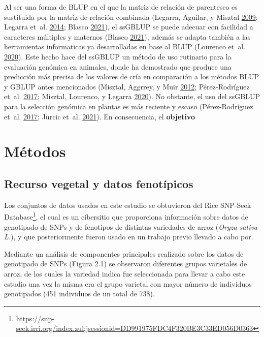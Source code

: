 \documentclass[11pt,spanish,a4paper,oneside,]{book} %
\renewcommand{\href}[2]{#2\footnote{\url{#1}}}
\let\rmarkdownfootnote\footnote%
\def\footnote{\protect\rmarkdownfootnote}
\begin{document}
Al ser una forma de BLUP en el que la matriz de relación de parentesco es sustituida por la matriz de relación combinada (Legarra, Aguilar, y Misztal \protect\hyperlink{ref-cite:17}{2009}; Legarra et~al. \protect\hyperlink{ref-cite:15}{2014}; Blasco \protect\hyperlink{ref-cite:21}{2021}), el ssGBLUP se puede adecuar con facilidad a caracteres múltiples y maternos (Blasco \protect\hyperlink{ref-cite:21}{2021}), además se adapta también a las herramientas informaticas ya desarrolladas en base al BLUP (Lourenco et~al. \protect\hyperlink{ref-cite:22}{2020}). Este hecho hace del ssGBLUP un método de uso rutinario para la evaluación genómica en animales, donde ha demostrado que produce una predicción más precisa de los valores de cría en comparación a los métodos BLUP y GBLUP antes mencionados (Misztal, Aggrrey, y Muir \protect\hyperlink{ref-cite:14}{2012}; Pérez-Rodríguez et~al. \protect\hyperlink{ref-cite:19}{2017}; Misztal, Lourenco, y Legarra \protect\hyperlink{ref-cite:18}{2020}). No obstante, el uso del ssGBLUP para la selección genómica en plantas es más reciente y escaso (Pérez-Rodríguez et~al. \protect\hyperlink{ref-cite:19}{2017}; Jurcic et~al. \protect\hyperlink{ref-cite:11}{2021}). En consecuencia, el \textbf{objetivo}

\hypertarget{methods2}{%
\section{Métodos}\label{methods2}}

\hypertarget{recurso-vegetal-y-datos-fenotuxedpicos}{%
\subsection{Recurso vegetal y datos fenotípicos}\label{recurso-vegetal-y-datos-fenotuxedpicos}}

Los conjuntos de datos usados en este estudio se obtuvieron del \href{https://snp-seek.irri.org/index.zul;jsessionid=DD991975FDC4F320BE3C33ED056D0363}{Rice SNP-Seek Database}, el cual es un cibersitio que proporciona información sobre datos de genotipado de SNPs y de fenotipos de distintas variedades de arroz (\emph{Oryza sativa L.}), y que posteriormente fueron usado en un trabajo previo llevado a cabo por.

Mediante un análisis de componentes principales realizado sobre los datos de genotipado de SNPs (Figura 2.1) se observaron diferentes grupos varietales de arroz, de los cuales la variedad indica fue seleccionada para llevar a cabo este estudio una vez la misma era el grupo varietal con mayor número de individuos genotipados (451 individuos de un total de 738).
\end{document}
